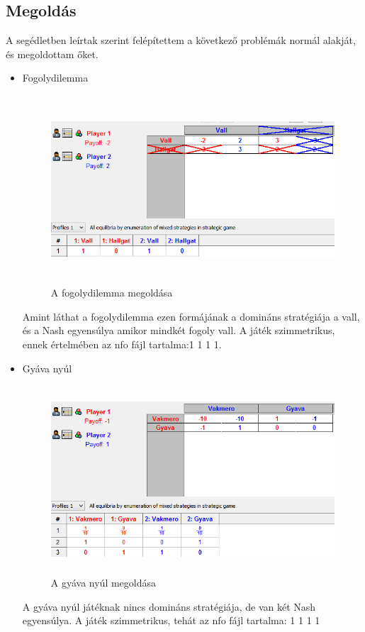 \subsection{Megoldás}
A segédletben leírtak szerint felépítettem a következő problémák normál alakját, és megoldottam őket.
\begin{itemize}
\item Fogolydilemma
		\begin{figure}[!h]
		\begin{center}
		\includegraphics[height=7cm]{figures/fogoly.png}
		\caption{A fogolydilemma megoldása}
		\end{center}
		\end{figure}
Amint láthat a fogolydilemma ezen formájának a domináns stratégiája a vall, és a Nash egyensúlya amikor mindkét fogoly vall. A játék szimmetrikus, ennek értelmében az nfo fájl tartalma:1	1	1 1.
		
\item Gyáva nyúl
		\begin{figure}[!h]
		\begin{center}
		\includegraphics[height=7cm]{figures/nyul.png}
		\caption{A gyáva nyúl megoldása}
		\end{center}
		\end{figure}
A gyáva nyúl játéknak nincs domináns stratégiája, de van két Nash egyensúlya. A játék szimmetrikus, tehát az nfo fájl tartalma: 1	1	1 1
		

\end{itemize}
